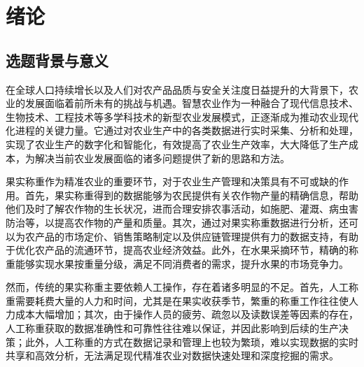 \chapter{绪论}

\section{选题背景与意义}

在全球人口持续增长以及人们对农产品品质与安全关注度日益提升的大背景下，农业的发展面临着前所未有的挑战与机遇。智慧农业作为一种融合了现代信息技术、生物技术、工程技术等多学科技术的新型农业发展模式\cite{赵春江2021智慧农业的发展现状与未来展望}，正逐渐成为推动农业现代化进程的关键力量。它通过对农业生产中的各类数据进行实时采集、分析和处理，实现了农业生产的数字化和智能化\cite{李道亮2012物联网与智慧农业}，有效提高了农业生产效率，大大降低了生产成本，为解决当前农业发展面临的诸多问题提供了新的思路和方法。

果实称重作为精准农业的重要环节，对于农业生产管理和决策具有不可或缺的作用\cite{罗锡文2016信息技术提升农业机械化水平}。首先，果实称重得到的数据能够为农民提供有关农作物产量的精确信息，帮助他们及时了解农作物的生长状况\cite{翁杨2019基于深度学习的农业植物表型研究综述}，进而合理安排农事活动，如施肥、灌溉、病虫害防治等，以提高农作物的产量和质量。其次，通过对果实称重数据进行分析，还可以为农产品的市场定价、销售策略制定以及供应链管理提供有力的数据支持，有助于优化农产品的流通环节，提高农业经济效益\cite{Lipcsei2021AnalysisOA}。此外，在水果采摘环节，精确的称重能够实现水果按重量分级，满足不同消费者的需求，提升水果的市场竞争力\cite{Ji2019}。

然而，传统的果实称重主要依赖人工操作，存在着诸多明显的不足。首先，人工称重需要耗费大量的人力和时间，尤其是在果实收获季节，繁重的称重工作往往使人力成本大幅增加\cite{Jiang2012}；其次，由于操作人员的疲劳、疏忽以及读数误差等因素的存在，人工称重获取的数据准确性和可靠性往往难以保证，并因此影响到后续的生产决策\cite{Chen2002}；此外，人工称重的方式在数据记录和管理上也较为繁琐，难以实现数据的实时共享和高效分析，无法满足现代精准农业对数据快速处理和深度挖掘的需求\cite{Widagdo2020RecordingSO}。

